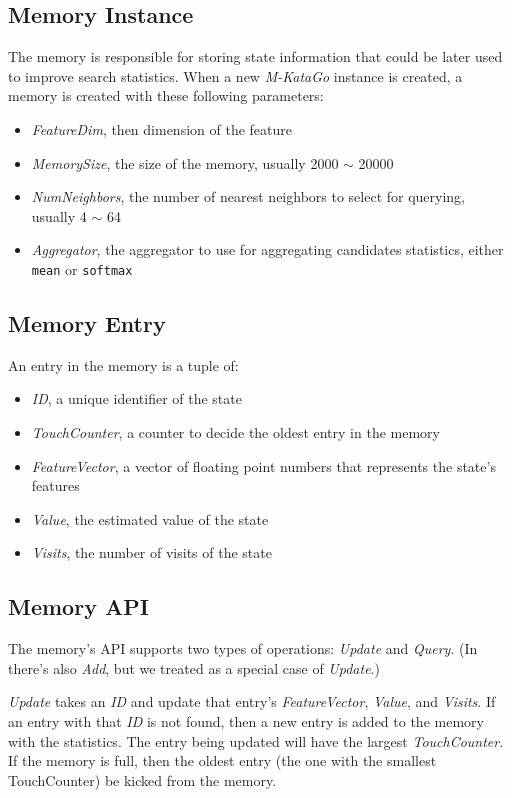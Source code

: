 \documentclass{article}
\newcommand{\mkatago}{\emph{M-KataGo}\xspace}
\begin{document}
\subsection{Memory Instance}
The memory is responsible for storing state information that could be later used to improve search statistics.
When a new \mkatago instance is created, a memory is created with these following parameters:
\begin{itemize}
    \item \textit{FeatureDim}, then dimension of the feature
    \item \textit{MemorySize}, the size of the memory, usually 2000 $\sim$ 20000
    \item \textit{NumNeighbors}, the number of nearest neighbors to select for querying, usually 4 $\sim$ 64
    \item \textit{Aggregator}, the aggregator to use for aggregating candidates statistics, either \texttt{mean} or \texttt{softmax}
\end{itemize}

\subsection{Memory Entry}
An entry in the memory is a tuple of:
\begin{itemize}
    \item \textit{ID}, a unique identifier of the state
    \item \textit{TouchCounter}, a counter to decide the oldest entry in the memory
    \item \textit{FeatureVector}, a vector of floating point numbers that represents the state's features
    \item \textit{Value}, the estimated value of the state
    \item \textit{Visits}, the number of visits of the state
\end{itemize}

\subsection{Memory API}
The memory's API supports two types of operations: \textit{Update} and \textit{Query}.
(In \cite{xiao_memory-augmented_2018} there's also \textit{Add}, but we treated as a special case of \textit{Update}.)

\textit{Update} takes an \textit{ID} and update that entry's \textit{FeatureVector}, \textit{Value}, and \textit{Visits}.
If an entry with that \textit{ID} is not found, then a new entry is added to the memory with the statistics.
The entry being updated will have the largest \textit{TouchCounter}.
If the memory is full, then the oldest entry (the one with the smallest TouchCounter) be kicked from the memory.
\end{document}
